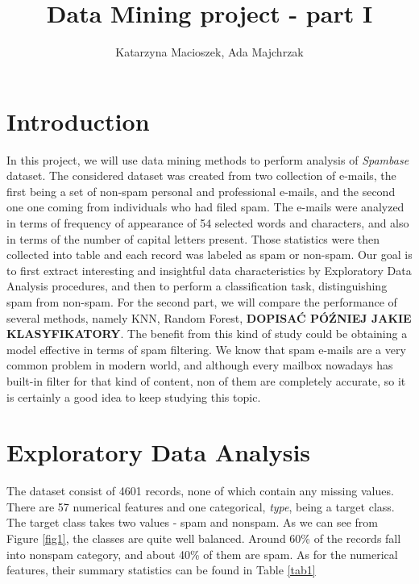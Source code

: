 \documentclass{article}\usepackage[]{graphicx}\usepackage[]{xcolor}
\author{Katarzyna Macioszek, Ada Majchrzak}
\title{Data Mining project - part I}
\begin{document}
\maketitle

\section{Introduction}

In this project, we will use data mining methods to perform analysis of \textit{Spambase}
dataset. The considered dataset was created from two collection of e-mails, 
the first being a set of non-spam personal and professional e-mails, and the 
second one one coming from individuals who had filed spam. The e-mails were 
analyzed in terms of frequency of appearance of 54 selected words and characters,
and also in terms of the number of capital letters present. 
Those statistics were then collected into table and each record was labeled 
as spam or non-spam. Our goal is to first extract interesting and insightful data characteristics
by Exploratory Data Analysis procedures, and then to perform a classification task,
distinguishing spam from non-spam. For the second part, we will compare the performance
of several methods, namely KNN, Random Forest, \textbf{DOPISAĆ PÓŹNIEJ JAKIE KLASYFIKATORY}.
The benefit from this kind of study could be obtaining a model effective in terms 
of spam filtering. We know that spam e-mails are a very common problem in modern 
world, and although every mailbox nowadays has built-in filter for that kind
of content, non of them are completely accurate, so it is certainly a good idea
to keep studying this topic.

\section{Exploratory Data Analysis}



The dataset consist of 4601 records, none of which contain any missing values.
There are 57 numerical features and one categorical, \textit{type}, being a target class.
The target class takes two values - spam and nonspam. As we can see from Figure \ref{fig1},
the classes are quite well balanced. Around 60\% of the records fall into nonspam category,
and about 40\% of them are spam. As for the numerical features, their summary statistics
can be found in Table \ref{tab1}
\end{document}
